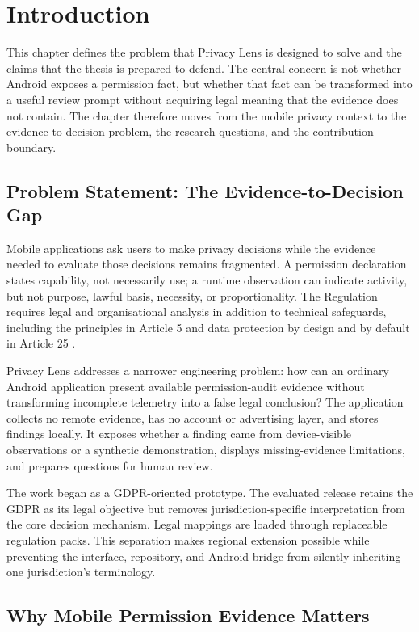 \section{Introduction}

This chapter defines the problem that Privacy Lens is designed to solve and the claims that the thesis is prepared to defend. The central concern is not whether Android exposes a permission fact, but whether that fact can be transformed into a useful review prompt without acquiring legal meaning that the evidence does not contain. The chapter therefore moves from the mobile privacy context to the evidence-to-decision problem, the research questions, and the contribution boundary.

\subsection{Problem Statement: The Evidence-to-Decision Gap}

Mobile applications ask users to make privacy decisions while the evidence needed to evaluate those decisions remains fragmented. A permission declaration states capability, not necessarily use; a runtime observation can indicate activity, but not purpose, lawful basis, necessity, or proportionality. The Regulation requires legal and organisational analysis in addition to technical safeguards, including the principles in Article 5 and data protection by design and by default in Article 25 \cite{eurlex2016,edpb2019}.

Privacy Lens addresses a narrower engineering problem: how can an ordinary Android application present available permission-audit evidence without transforming incomplete telemetry into a false legal conclusion? The application collects no remote evidence, has no account or advertising layer, and stores findings locally. It exposes whether a finding came from device-visible observations or a synthetic demonstration, displays missing-evidence limitations, and prepares questions for human review.

The work began as a GDPR-oriented prototype. The evaluated release retains the GDPR as its legal objective but removes jurisdiction-specific interpretation from the core decision mechanism. Legal mappings are loaded through replaceable regulation packs. This separation makes regional extension possible while preventing the interface, repository, and Android bridge from silently inheriting one jurisdiction's terminology.

\subsection{Why Mobile Permission Evidence Matters}

